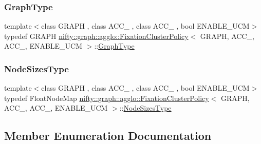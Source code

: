 \subsubsection{\texorpdfstring{Graph\+Type}{GraphType}}
{\footnotesize\ttfamily template$<$class G\+R\+A\+PH , class A\+C\+C\+\_ , class A\+C\+C\+\_ , bool E\+N\+A\+B\+L\+E\+\_\+\+U\+CM$>$ \\
typedef G\+R\+A\+PH \hyperlink{classnifty_1_1graph_1_1agglo_1_1FixationClusterPolicy}{nifty\+::graph\+::agglo\+::\+Fixation\+Cluster\+Policy}$<$ G\+R\+A\+PH, A\+C\+C\+\_, A\+C\+C\+\_, E\+N\+A\+B\+L\+E\+\_\+\+U\+CM $>$\+::\hyperlink{classnifty_1_1graph_1_1agglo_1_1FixationClusterPolicy_a1b20f47fae0c5f5a247ca049bb60400b}{Graph\+Type}}

\mbox{\label{classnifty_1_1graph_1_1agglo_1_1FixationClusterPolicy_a4599c55961921f00a208ee6d04ff8f18}} 
\subsubsection{\texorpdfstring{Node\+Sizes\+Type}{NodeSizesType}}
{\footnotesize\ttfamily template$<$class G\+R\+A\+PH , class A\+C\+C\+\_ , class A\+C\+C\+\_ , bool E\+N\+A\+B\+L\+E\+\_\+\+U\+CM$>$ \\
typedef Float\+Node\+Map \hyperlink{classnifty_1_1graph_1_1agglo_1_1FixationClusterPolicy}{nifty\+::graph\+::agglo\+::\+Fixation\+Cluster\+Policy}$<$ G\+R\+A\+PH, A\+C\+C\+\_, A\+C\+C\+\_, E\+N\+A\+B\+L\+E\+\_\+\+U\+CM $>$\+::\hyperlink{classnifty_1_1graph_1_1agglo_1_1FixationClusterPolicy_a4599c55961921f00a208ee6d04ff8f18}{Node\+Sizes\+Type}}



\subsection{Member Enumeration Documentation}
\mbox{\label{classnifty_1_1graph_1_1agglo_1_1FixationClusterPolicy_acb3c9f163adf8275650f22017535e684}} 
